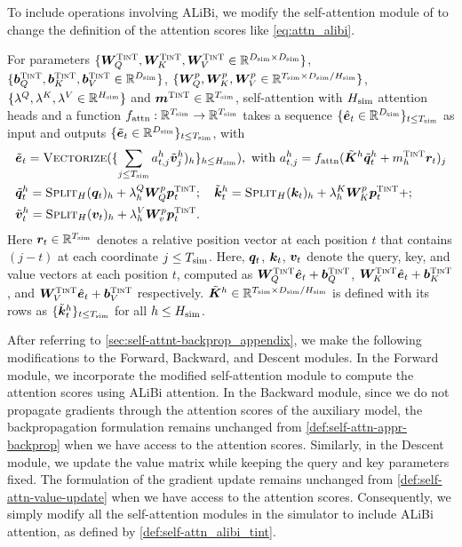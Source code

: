 To include operations involving ALiBi, we modify the self-attention module of \simulator{} to change the definition of the attention scores like \cref{eq:attn_alibi}.
\begin{definition}\label{def:self-attn_alibi_tint}
    For parameters $\{ {{\bm{W}}}^{\textsc{TinT}}_Q, {{\bm{W}}}^{\textsc{TinT}}_K, {{\bm{W}}}^{\textsc{TinT}}_V \in \mathbb{R}^{ D_{\text{sim}} \times D_{\text{sim}} } \}$, $\{ {{\bm{b}}}^{\textsc{TinT}}_Q, {{\bm{b}}}^{\textsc{TinT}}_K, {{\bm{b}}}^{\textsc{TinT}}_V \in \mathbb{R}^{D_{\text{sim}}} \}$, $\{ {\bm{W}}^p_Q, {\bm{W}}^p_K, {\bm{W}}^p_V \in \mathbb{R}^{ T_{\text{sim}} \times D_{\text{sim}}/H_{\text{sim}} } \}$, $\{ \lambda^{Q},  \lambda^{K}, \lambda^{V} \in \mathbb{R}^{ H_{\text{sim}} } \}$ and ${{\bm{m}}}^{\textsc{TinT}} \in \mathbb{R}^{T_{\text{sim}}}$, \simulator{} self-attention with $H_{\text{sim}}$ attention heads and a function $f_{\mathrm{attn}}: \mathbb{R}^{ T_{\text{sim}} } \to \mathbb{R}^{ T_{\text{sim}} }$ takes a sequence $\{ \Hat{\ve}_t\in\RR^ { \simu{D} }  \}_{t \le \simu{T}}$ as input and outputs $\{ \Tilde{\ve}_t \in \RR^{ \simu{D} } \}_{t \le \simu{T} }$, with 
    \begin{align*}
        &\Tilde{\ve}_t = \attmerge ( \{ \sum_{j \le \simu{T} } a^h_{t, j}  \Tilde{\vv}^{h}_j )_h \}_{h \le \simu{H} } ), \text{ with   } a^h_{t, j} =
        \attnfn ( \Tilde{\mK}^{h} \Tilde{\vq}_t^h + \simuw{m}_h \vr_t )_j  \\
        &\Tilde{\vq}^{h}_t = \attsplit_H (\vq_t)_h + \lambda^Q_h \mW^p_Q \simuw{\vp}_t; \quad \Tilde{\vk}^{h}_t = \attsplit_H (\vk_t)_h + \lambda^K_h \mW^p_K \simuw{\vp}_t + ; \\& \Tilde{\vv}^{h}_t = \attsplit_H (\vv_t)_h + \lambda^V_h \mW^p_v \simuw{\vp}_t .
    \end{align*}    
     Here ${\bm{r}}_t \in \mathbb{R}^{T_{\text{sim}}}$ denotes a relative position vector at each position $t$ that contains $(j - t)$ at each coordinate $j \le T_{\text{sim}}$. Here, ${\bm{q}}_t$, ${\bm{k}}_t$, ${\bm{v}}_t$ denote the query, key, and value vectors at each position $t$, computed as $\simuw{\mW}_Q \Hat{\ve}_t + \simuw{\vb}_Q$, $\simuw{\mW}_K \Hat{\ve}_t + \simuw{\vb}_K$, and $\simuw{\mW}_V \Hat{\ve}_t + \simuw{\vb}_V$ respectively.
     $\Tilde{{\bm{K}}}^h \in \mathbb{R}^{ T_{\text{sim}} \times D_{\text{sim}}/H_{\text{sim}} }$ is defined with its rows as $\{\Tilde{{\bm{k}}}^h_t\}_{t \le T_{\text{sim}}}$ for all $h \le H_{\text{sim}}$.
\end{definition}


After referring to \cref{sec:self-attnt-backprop_appendix}, we make the following modifications to the Forward, Backward, and Descent modules. In the Forward module, we incorporate the modified self-attention module to compute the attention scores using ALiBi attention. In the Backward module, since we do not propagate gradients through the attention scores of the auxiliary model, the backpropagation formulation remains unchanged from \cref{def:self-attn-appr-backprop} when we have access to the attention scores. Similarly, in the Descent module, we update the value matrix while keeping the query and key parameters fixed. The formulation of the gradient update remains unchanged from \cref{def:self-attn-value-update} when we have access to the attention scores. Consequently, we simply modify all the self-attention modules in the simulator to include ALiBi attention, as defined by \cref{def:self-attn_alibi_tint}.






